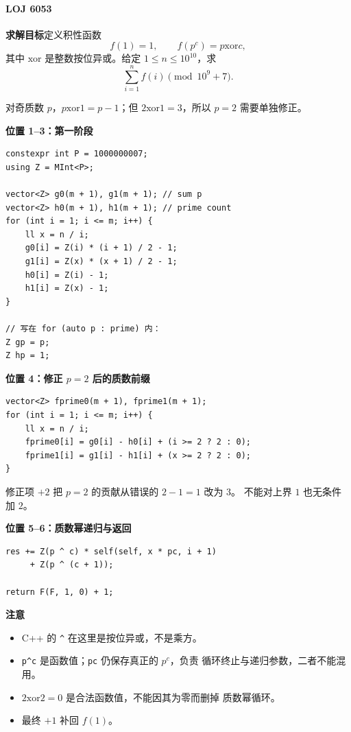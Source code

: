 \paragraph*{LOJ 6053}

\textbf{求解目标}\quad 定义积性函数
\[
f(1)=1,\qquad
f(p^c)=p\mathbin{\mathrm{xor}}c,
\]
其中 \(\mathrm{xor}\) 是整数按位异或。给定 \(1\le n\le10^{10}\)，求
\[
\sum_{i=1}^{n}f(i)\pmod {10^9+7}.
\]

对奇质数 \(p\)，\(p\mathbin{\mathrm{xor}}1=p-1\)；但
\(2\mathbin{\mathrm{xor}}1=3\)，所以 \(p=2\) 需要单独修正。

\textbf{位置 1--3：第一阶段}

\begin{verbatim}
constexpr int P = 1000000007;
using Z = MInt<P>;

vector<Z> g0(m + 1), g1(m + 1); // sum p
vector<Z> h0(m + 1), h1(m + 1); // prime count
for (int i = 1; i <= m; i++) {
    ll x = n / i;
    g0[i] = Z(i) * (i + 1) / 2 - 1;
    g1[i] = Z(x) * (x + 1) / 2 - 1;
    h0[i] = Z(i) - 1;
    h1[i] = Z(x) - 1;
}

// 写在 for (auto p : prime) 内：
Z gp = p;
Z hp = 1;
\end{verbatim}

\textbf{位置 4：修正 \(p=2\) 后的质数前缀}

\begin{verbatim}
vector<Z> fprime0(m + 1), fprime1(m + 1);
for (int i = 1; i <= m; i++) {
    ll x = n / i;
    fprime0[i] = g0[i] - h0[i] + (i >= 2 ? 2 : 0);
    fprime1[i] = g1[i] - h1[i] + (x >= 2 ? 2 : 0);
}
\end{verbatim}

修正项 \(+2\) 把 \(p=2\) 的贡献从错误的 \(2-1=1\) 改为 \(3\)。
不能对上界 \(1\) 也无条件加 \(2\)。

\textbf{位置 5--6：质数幂递归与返回}

\begin{verbatim}
res += Z(p ^ c) * self(self, x * pc, i + 1)
     + Z(p ^ (c + 1));

return F(F, 1, 0) + 1;
\end{verbatim}

\textbf{注意}

\begin{itemize}
    \item C++ 的 \texttt{\textasciicircum} 在这里是按位异或，不是乘方。
    \item \texttt{p\textasciicircum c} 是函数值；\texttt{pc} 仍保存真正的 \(p^c\)，负责
          循环终止与递归参数，二者不能混用。
    \item \(2\mathbin{\mathrm{xor}}2=0\) 是合法函数值，不能因其为零而删掉
          质数幂循环。
    \item 最终 \(+1\) 补回 \(f(1)\)。
\end{itemize}

